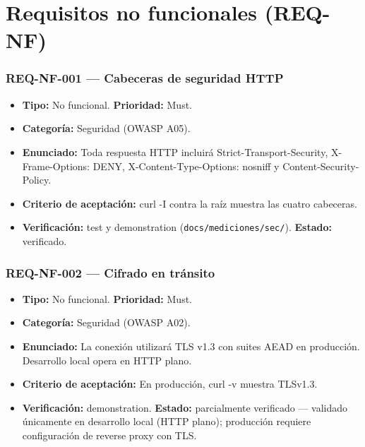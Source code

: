 \documentclass[12pt,a4paper]{article}
\begin{document}
\clearpage

\section{Requisitos no funcionales (REQ-NF)}
\label{sec:rnf}

\subsubsection{REQ-NF-001 --- Cabeceras de seguridad HTTP}
\begin{itemize}
  \item \textbf{Tipo:} No funcional. \textbf{Prioridad:} Must.
  \item \textbf{Categoría:} Seguridad (OWASP A05).
  \item \textbf{Enunciado:} Toda respuesta HTTP incluirá Strict-Transport-Security, X-Frame-Options: DENY, X-Content-Type-Options: nosniff y Content-Security-Policy.
  \item \textbf{Criterio de aceptación:} curl -I contra la raíz muestra las cuatro cabeceras.
  \item \textbf{Verificación:} test y demonstration (\texttt{docs/mediciones/sec/}). \textbf{Estado:} verificado.
\end{itemize}

\subsubsection{REQ-NF-002 --- Cifrado en tránsito}
\begin{itemize}
  \item \textbf{Tipo:} No funcional. \textbf{Prioridad:} Must.
  \item \textbf{Categoría:} Seguridad (OWASP A02).
  \item \textbf{Enunciado:} La conexión utilizará TLS v1.3 con suites AEAD en producción. Desarrollo local opera en HTTP plano.
  \item \textbf{Criterio de aceptación:} En producción, curl -v muestra TLSv1.3.
  \item \textbf{Verificación:} demonstration. \textbf{Estado:} parcialmente verificado --- validado únicamente en desarrollo local (HTTP plano); producción requiere configuración de reverse proxy con TLS.
\end{itemize}
\end{document}

